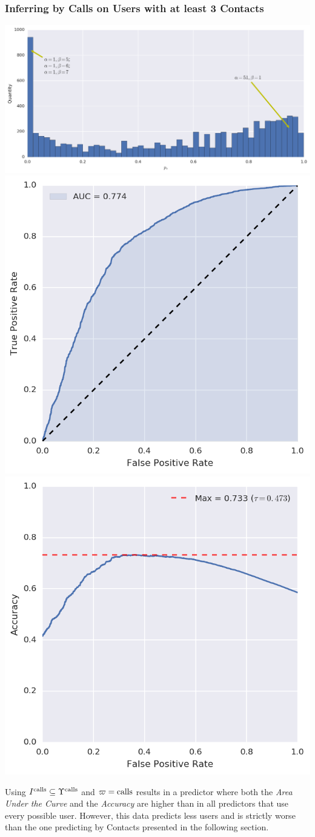 \subsubsection{Inferring by Calls on Users with at least 3 Contacts}

\begin{center}
\includegraphics[width=\textwidth]{figures/bayes/3contacts/hist_calls.png}
\includegraphics[width=.49\textwidth]{figures/bayes/3contacts/roc_calls.png}
\includegraphics[width=.49\textwidth]{figures/bayes/3contacts/accuracy_calls.png}
\end{center}

Using $I^{\operatorname{calls}} \subseteq \Upsilon^{\operatorname{calls}}$ and $\varpi = \operatorname{calls}$ results in a predictor where both the \emph{Area Under the Curve} and the \emph{Accuracy} are higher than in all predictors that use every possible user. However, this data predicts less users and is strictly worse than the one predicting by Contacts presented in the following section.

